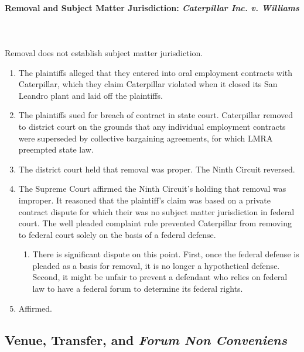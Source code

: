 \paragraph{Removal and Subject Matter Jurisdiction: \emph{Caterpillar Inc. v.  
Williams}}
~\\\\
Removal does not establish subject matter jurisdiction.

\begin{enumerate}
    \item The plaintiffs alleged that they entered into oral employment 
    contracts with Caterpillar, which they claim Caterpillar violated when it 
    closed its San Leandro plant and laid off the plaintiffs.
    \item The plaintiffs sued for breach of contract in state court.  
    Caterpillar removed to district court on the grounds that any individual 
    employment contracts were superseded by collective bargaining agreements, 
    for which LMRA preempted state law.
    \item The district court held that removal was proper. The Ninth Circuit 
    reversed.
    \item The Supreme Court affirmed the Ninth Circuit's holding that removal 
    was improper. It reasoned that the plaintiff's claim was based on a 
    private contract dispute for which their was no subject matter 
    jurisdiction in federal court. The well pleaded complaint rule prevented 
    Caterpillar from removing to federal court solely on the basis of a 
    federal defense.
    \begin{enumerate}
        \item There is significant dispute on this point. First, once the 
        federal defense is pleaded as a basis for removal, it is no longer a 
        hypothetical defense. Second, it might be unfair to prevent a 
        defendant who relies on federal law to have a federal forum to 
        determine its federal rights.
    \end{enumerate}
    \item Affirmed.
\end{enumerate}

\subsection{Venue, Transfer, and \emph{Forum Non Conveniens}}

